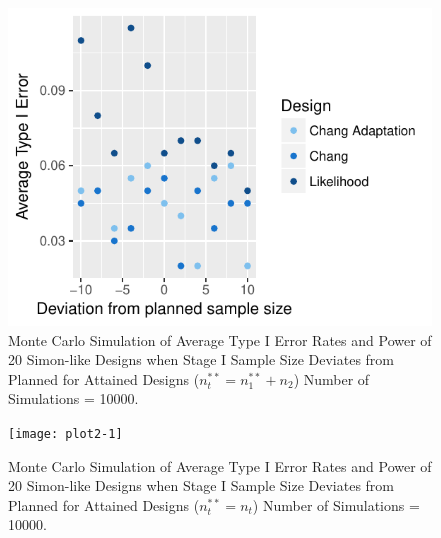 \documentclass[12pt]{report}\usepackage[]{graphicx}\usepackage[]{color}
\newlength{\li}\setlength{\li}{14.48pt}
\begin{document}
% 
\begin{landscape}
\begin{figure}[]
\caption{Monte Carlo Simulation of Average Type I Error Rates and Power of 20 Simon-like Designs when Stage I Sample Size Deviates from Planned for Attained Designs ($n_t^{\ast\ast} = n_1^{\ast\ast} + n_2$) Number of Simulations = 10000.}
\centering
\begin{Schunk}


\centerline{\includegraphics{plot1-1} }

\end{Schunk}
\end{figure}
\end{landscape}


\begin{landscape}
\begin{figure}[]
\caption{Monte Carlo Simulation of Average Type I Error Rates and Power of 20 Simon-like Designs when Stage I Sample Size Deviates from Planned for Attained Designs ($n_t^{\ast\ast} = n_t$) Number of Simulations = 10000.}
\begin{Schunk}


\centerline{\texttt{[image: plot2-1]} }

\end{Schunk}
\end{figure}
\end{landscape}
\end{document}
